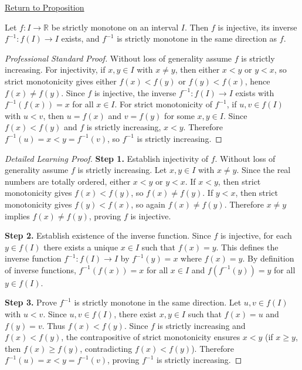 \newpage
{}
\label{prf:inverse-strictly-monotone}

\begin{remark*}[Return]
\hyperref[prop:inverse-strictly-monotone]{Return to Proposition}
\end{remark*}

\begin{theorem*}
Let $f : I \to \mathbb{R}$ be strictly monotone on an interval $I$. Then $f$ is injective, its inverse $f^{-1} : f(I) \to I$ exists, and $f^{-1}$ is strictly monotone in the same direction as $f$.
\end{theorem*}

\begin{proof}[Professional Standard Proof]
\LRAProofBodyStart
Without loss of generality assume $f$ is strictly increasing. For injectivity, if $x, y \in I$ with $x \neq y$, then either $x < y$ or $y < x$, so strict monotonicity gives either $f(x) < f(y)$ or $f(y) < f(x)$, hence $f(x) \neq f(y)$. Since $f$ is injective, the inverse $f^{-1} : f(I) \to I$ exists with $f^{-1}(f(x)) = x$ for all $x \in I$. For strict monotonicity of $f^{-1}$, if $u, v \in f(I)$ with $u < v$, then $u = f(x)$ and $v = f(y)$ for some $x, y \in I$. Since $f(x) < f(y)$ and $f$ is strictly increasing, $x < y$. Therefore $f^{-1}(u) = x < y = f^{-1}(v)$, so $f^{-1}$ is strictly increasing.
\end{proof}

\begin{proof}[Detailed Learning Proof]
\LRAProofBodyStart

\textbf{Step 1.} Establish injectivity of $f$.
Without loss of generality assume $f$ is strictly increasing. Let $x, y \in I$ with $x \neq y$. Since the real numbers are totally ordered, either $x < y$ or $y < x$. If $x < y$, then strict monotonicity gives $f(x) < f(y)$, so $f(x) \neq f(y)$. If $y < x$, then strict monotonicity gives $f(y) < f(x)$, so again $f(x) \neq f(y)$. Therefore $x \neq y$ implies $f(x) \neq f(y)$, proving $f$ is injective.

\textbf{Step 2.} Establish existence of the inverse function.
Since $f$ is injective, for each $y \in f(I)$ there exists a unique $x \in I$ such that $f(x) = y$. This defines the inverse function $f^{-1} : f(I) \to I$ by $f^{-1}(y) = x$ where $f(x) = y$. By definition of inverse functions, $f^{-1}(f(x)) = x$ for all $x \in I$ and $f(f^{-1}(y)) = y$ for all $y \in f(I)$.

\textbf{Step 3.} Prove $f^{-1}$ is strictly monotone in the same direction.
Let $u, v \in f(I)$ with $u < v$. Since $u, v \in f(I)$, there exist $x, y \in I$ such that $f(x) = u$ and $f(y) = v$. Thus $f(x) < f(y)$. Since $f$ is strictly increasing and $f(x) < f(y)$, the contrapositive of strict monotonicity ensures $x < y$ (if $x \geq y$, then $f(x) \geq f(y)$, contradicting $f(x) < f(y)$). Therefore $f^{-1}(u) = x < y = f^{-1}(v)$, proving $f^{-1}$ is strictly increasing.
\end{proof}

